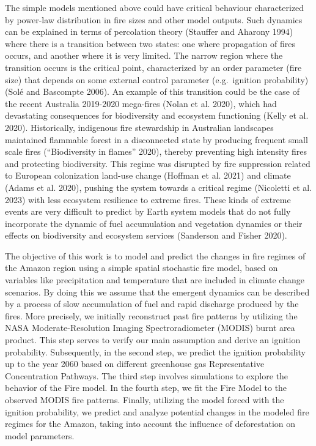 \documentclass[
]{article}
\begin{document}
The simple models mentioned above could have critical behaviour
characterized by power-law distribution in fire sizes and other model
outputs. Such dynamics can be explained in terms of percolation theory
(Stauffer and Aharony 1994) where there is a transition between two
states: one where propagation of fires occurs, and another where it is
very limited. The narrow region where the transition occurs is the
critical point, characterized by an order parameter (fire size) that
depends on some external control parameter (e.g.~ignition probability)
(Solé and Bascompte 2006). An example of this transition could be the
case of the recent Australia 2019-2020 mega-fires (Nolan et al. 2020),
which had devastating consequences for biodiversity and ecosystem
functioning (Kelly et al. 2020). Historically, indigenous fire
stewardship in Australian landscapes maintained flammable forest in a
disconnected state by producing frequent small scale fires
({``Biodiversity in flames''} 2020), thereby preventing high intensity
fires and protecting biodiversity. This regime was disrupted by fire
suppression related to European colonization land-use change (Hoffman et
al. 2021) and climate (Adams et al. 2020), pushing the system towards a
critical regime (Nicoletti et al. 2023) with less ecosystem resilience
to extreme fires. These kinds of extreme events are very difficult to
predict by Earth system models that do not fully incorporate the dynamic
of fuel accumulation and vegetation dynamics or their effects on
biodiversity and ecosystem services (Sanderson and Fisher 2020).

The objective of this work is to model and predict the changes in fire
regimes of the Amazon region using a simple spatial stochastic fire
model, based on variables like precipitation and temperature that are
included in climate change scenarios. By doing this we assume that the
emergent dynamics can be described by a process of slow accumulation of
fuel and rapid discharge produced by the fires. More precisely, we
initially reconstruct past fire patterns by utilizing the NASA
Moderate-Resolution Imaging Spectroradiometer (MODIS) burnt area
product. This step serves to verify our main assumption and derive an
ignition probability. Subsequently, in the second step, we predict the
ignition probability up to the year 2060 based on different greenhouse
gas Representative Concentration Pathways. The third step involves
simulations to explore the behavior of the Fire model. In the fourth
step, we fit the Fire Model to the observed MODIS fire patterns.
Finally, utilizing the model forced with the ignition probability, we
predict and analyze potential changes in the modeled fire regimes for
the Amazon, taking into account the influence of deforestation on model
parameters.
\end{document}
